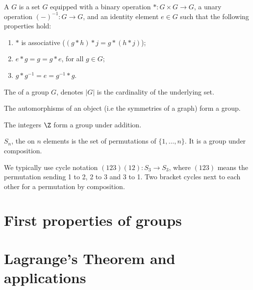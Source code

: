 \documentclass[12pt]{report}
\begin{document}
\begin{definition}\label{def:intro-to-group-theory:group}
  A  \(G\) is a set \(G\) equipped with a binary operation \(* : G \times G \to G\), a unary operation \((-)^{-1}: G \to G\), and an identity element \(e \in G\) such that the following properties hold:

  \begin{enumerate}
    \item \(*\) is associative (\((g * h) * j = g * (h * j)\));
    \item \(e * g = g = g * e\), for all \(g \in G\);
    \item \(g * g^{-1} = e = g^{-1} * g\).
  \end{enumerate}

  The  of a group \(G\), denotes \(|G|\) is the cardinality of the underlying set.
\end{definition}

\begin{example}
  The automorphisms of an object (i.e the symmetries of a graph) form a group.
\end{example}

\begin{example}
  The integers \(\Z\) form a group under addition.
\end{example}

\begin{example}
  \(S_{n}\), the  on \(n\) elements is the set of permutations of \(\{1, \ldots, n\}\). It is a group under composition.

  We typically use cycle notation \((123)(12): S_{3} \to S_{3}\), where \((123)\) means the permutation sending 1 to 2, 2 to 3 and 3 to 1. Two bracket cycles next to each other for a permutation by composition.
\end{example}

\begin{example}

\end{example}

\section{First properties of groups}\label{sec:intro-to-group-theory:first-prop-groups} %

\section{Lagrange's Theorem and applications}\label{sec:intro-to-group-theory:lagrange} %
\end{document}
